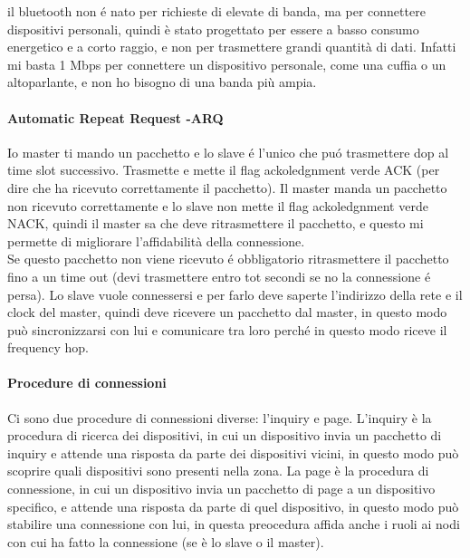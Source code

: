 il bluetooth non é nato per richieste di elevate di banda, ma per connettere dispositivi personali, quindi è stato progettato per essere a basso consumo energetico e a corto raggio, e non per trasmettere grandi quantità di dati. Infatti mi basta 1 Mbps per connettere un dispositivo personale, come una cuffia o un altoparlante, e non ho bisogno di una banda più ampia.\\

\paragraph{Automatic Repeat Request -ARQ}
Io master ti mando un pacchetto e lo slave é l'unico che puó trasmettere dop al time slot successivo. Trasmette e mette il flag ackoledgnment verde ACK (per dire che ha ricevuto correttamente il pacchetto). Il master manda un pacchetto non ricevuto correttamente e lo slave non mette il flag ackoledgnment verde NACK, quindi il master sa che deve ritrasmettere il pacchetto, e questo mi permette di migliorare l'affidabilità della connessione.\\

Se questo pacchetto non viene ricevuto é obbligatorio ritrasmettere il pacchetto fino a un time out (devi trasmettere entro tot secondi se no la connessione é persa). Lo slave vuole connessersi e per farlo deve saperte l'indirizzo della rete e il clock del master, quindi deve ricevere un pacchetto dal master, in questo modo può sincronizzarsi con lui e comunicare tra loro perché in questo modo riceve il frequency hop.\\

\paragraph{Procedure di connessioni}
Ci sono due procedure di connessioni diverse: l'inquiry e page. L'inquiry è la procedura di ricerca dei dispositivi, in cui un dispositivo invia un pacchetto di inquiry e attende una risposta da parte dei dispositivi vicini, in questo modo può scoprire quali dispositivi sono presenti nella zona. La page è la procedura di connessione, in cui un dispositivo invia un pacchetto di page a un dispositivo specifico, e attende una risposta da parte di quel dispositivo, in questo modo può stabilire una connessione con lui, in questa preocedura affida anche i ruoli ai nodi con cui ha fatto la connessione (se è lo slave o il master).\\

